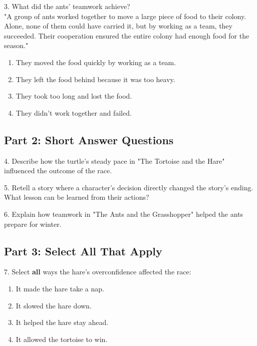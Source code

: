 \documentclass[12pt]{article}
\begin{document}
\vspace{1cm}

3. What did the ants’ teamwork achieve?\\
"A group of ants worked together to move a large piece of food to their colony. Alone, none of them could have carried it, but by working as a team, they succeeded. Their cooperation ensured the entire colony had enough food for the season."\\
\begin{enumerate}[label=\Alph*.]
    \item They moved the food quickly by working as a team.
    \item They left the food behind because it was too heavy.
    \item They took too long and lost the food.
    \item They didn’t work together and failed.
\end{enumerate}

\vspace{1cm}


\subsection*{Part 2: Short Answer Questions}

4. Describe how the turtle’s steady pace in "The Tortoise and the Hare" influenced the outcome of the race.\\
\vspace{4cm}

5. Retell a story where a character’s decision directly changed the story’s ending. What lesson can be learned from their actions?\\
\vspace{4cm}

6. Explain how teamwork in "The Ants and the Grasshopper" helped the ants prepare for winter.\\
\vspace{4cm}

\subsection*{Part 3: Select All That Apply}

7. Select \textbf{all} ways the hare’s overconfidence affected the race: \\
\begin{enumerate}[label=\Alph*.]
    \item It made the hare take a nap.  
    \item It slowed the hare down.  
    \item It helped the hare stay ahead.  
    \item It allowed the tortoise to win.  
\end{enumerate}
\end{document}
